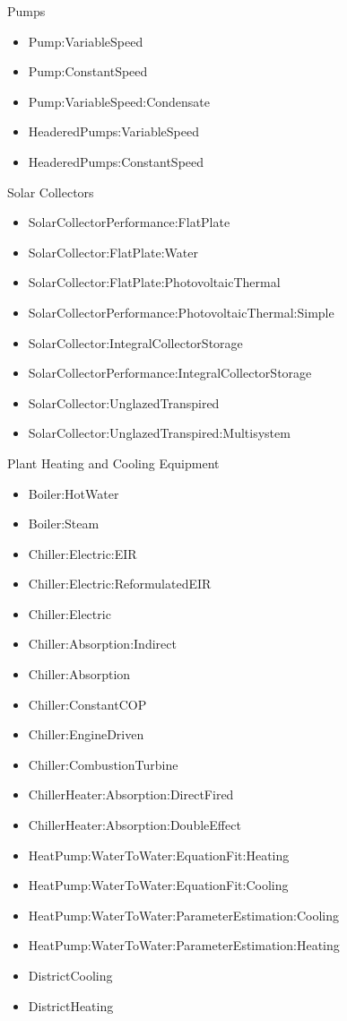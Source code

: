 Pumps

\begin{itemize}
\tightlist
\item
  Pump:VariableSpeed
\item
  Pump:ConstantSpeed
\item
  Pump:VariableSpeed:Condensate
\item
  HeaderedPumps:VariableSpeed
\item
  HeaderedPumps:ConstantSpeed
\end{itemize}

Solar Collectors

\begin{itemize}
\tightlist
\item
  SolarCollectorPerformance:FlatPlate
\item
  SolarCollector:FlatPlate:Water
\item
  SolarCollector:FlatPlate:PhotovoltaicThermal
\item
  SolarCollectorPerformance:PhotovoltaicThermal:Simple
\item
  SolarCollector:IntegralCollectorStorage
\item
  SolarCollectorPerformance:IntegralCollectorStorage
\item
  SolarCollector:UnglazedTranspired
\item
  SolarCollector:UnglazedTranspired:Multisystem
\end{itemize}

Plant Heating and Cooling Equipment

\begin{itemize}
\tightlist
\item
  Boiler:HotWater
\item
  Boiler:Steam
\item
  Chiller:Electric:EIR
\item
  Chiller:Electric:ReformulatedEIR
\item
  Chiller:Electric
\item
  Chiller:Absorption:Indirect
\item
  Chiller:Absorption
\item
  Chiller:ConstantCOP
\item
  Chiller:EngineDriven
\item
  Chiller:CombustionTurbine
\item
  ChillerHeater:Absorption:DirectFired
\item
  ChillerHeater:Absorption:DoubleEffect
\item
  HeatPump:WaterToWater:EquationFit:Heating
\item
  HeatPump:WaterToWater:EquationFit:Cooling
\item
  HeatPump:WaterToWater:ParameterEstimation:Cooling
\item
  HeatPump:WaterToWater:ParameterEstimation:Heating
\item
  DistrictCooling
\item
  DistrictHeating
\end{itemize}

